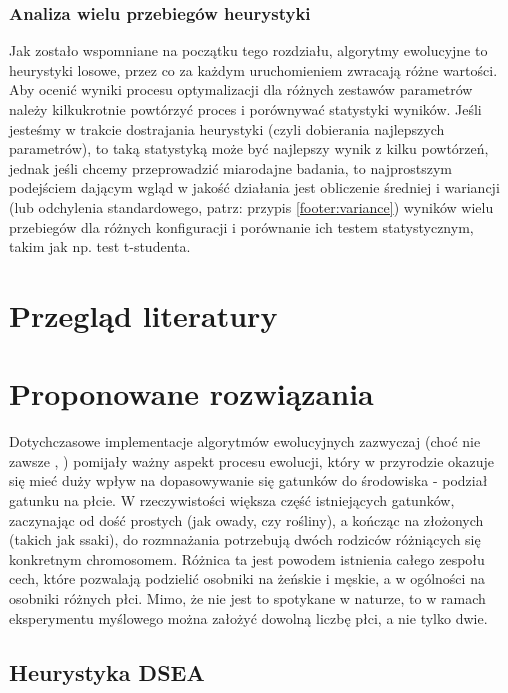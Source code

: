 \documentclass[twoside]{iisthesis}
\begin{document}
\subsection{Analiza wielu przebiegów heurystyki}

Jak zostało wspomniane na początku tego rozdziału, algorytmy ewolucyjne to heurystyki losowe, przez co za każdym uruchomieniem zwracają różne wartości. Aby ocenić wyniki procesu optymalizacji dla różnych zestawów parametrów należy kilkukrotnie powtórzyć proces i porównywać statystyki wyników. Jeśli jesteśmy w trakcie dostrajania heurystyki (czyli dobierania najlepszych parametrów), to taką statystyką może być najlepszy wynik z kilku powtórzeń, jednak jeśli chcemy przeprowadzić miarodajne badania, to najprostszym podejściem dającym wgląd w jakość działania jest obliczenie średniej i wariancji (lub odchylenia standardowego, patrz: przypis \ref{footer:variance}) wyników wielu przebiegów dla różnych konfiguracji i porównanie ich testem statystycznym, takim jak np. test t-studenta.

\chapter{Przegląd literatury} \label{chapter:literature}

\chapter{Proponowane rozwiązania} \label{chapter:proposed}

Dotychczasowe implementacje algorytmów ewolucyjnych zazwyczaj (choć nie zawsze \cite{GGA}, \cite{SexualGA}) pomijały ważny aspekt procesu ewolucji, który w przyrodzie okazuje się mieć duży wpływ na dopasowywanie się gatunków do środowiska - podział gatunku na płcie. W rzeczywistości większa część istniejących gatunków, zaczynając od dość prostych (jak owady, czy rośliny), a kończąc na złożonych (takich jak ssaki), do rozmnażania potrzebują dwóch rodziców różniących się konkretnym chromosomem. Różnica ta jest powodem istnienia całego zespołu cech, które pozwalają podzielić osobniki na żeńskie i męskie, a w ogólności na osobniki różnych płci. Mimo, że nie jest to spotykane w naturze, to w ramach eksperymentu myślowego można założyć dowolną liczbę płci, a nie tylko dwie.

\section{Heurystyka DSEA} \label{section:dsea}
\end{document}
